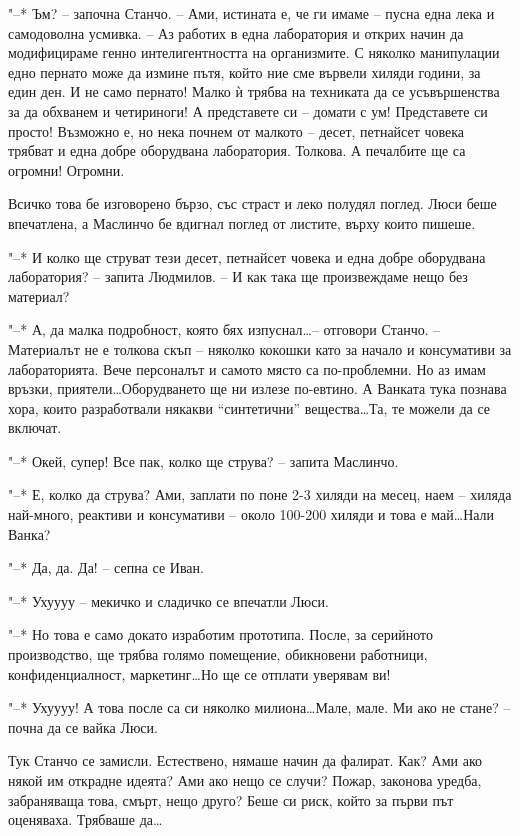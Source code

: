 \documentclass[ebook,openany,12pt]{memoir}
\begin{document}
"--* Ъм? – започна Станчо. – Ами, истината е, че ги имаме – пусна една лека и самодоволна усмивка. – Аз работих в една лаборатория и открих начин да модифицираме генно интелигентността на организмите. С няколко манипулации едно пернато може да измине пътя, който ние сме вървели хиляди години, за един ден. И не само пернато! Малко ѝ трябва на техниката да се усъвършенства за да обхванем и четириноги! А представете си – домати с ум! Представете си просто! Възможно е, но нека почнем от малкото – десет, петнайсет човека трябват и една добре оборудвана лаборатория. Толкова. А печалбите ще са огромни! Огромни.

Всичко това бе изговорено бързо, със страст и леко полудял поглед. Люси беше впечатлена, а Маслинчо бе вдигнал поглед от листите, върху които пишеше.

"--* И колко ще струват тези десет, петнайсет човека и една добре оборудвана лаборатория? – запита Людмилов. – И как така ще произвеждаме нещо без материал?

"--* А, да малка подробност, която бях изпуснал\ldots – отговори Станчо. – Материалът не е толкова скъп – няколко кокошки като за начало и консумативи за лабораторията. Вече персоналът и самото място са по-проблемни. Но аз имам връзки, приятели\ldots Оборудване\-то ще ни излезе по-евтино. А Ванката тука познава хора, които разработвали някакви ``синтетични'' вещества\ldots Та, те можели да се включат.

"--* Окей, супер! Все пак, колко ще струва? – запита Маслинчо.

"--* Е, колко да струва? Ами, заплати по поне 2-3 хиляди на месец, наем – хиляда най-много, реактиви и консумативи – около 100-200 хиляди и това е май\ldots Нали Ванка?

"--* Да, да. Да! – сепна се Иван.

"--* Ухуууу – мекичко и сладичко се впечатли Люси.

"--* Но това е само докато изработим прототипа. После, за серийното производство, ще трябва голямо помещение, обикновени работници, конфиденциалност, маркетинг\ldots Но ще се отплати уверявам ви!

"--* Ухуууу! А това после са си няколко милиона\ldots Ма\-ле, мале. Ми ако не стане? – почна да се вайка Люси.

Тук Станчо се замисли. Естествено, нямаше начин да фалират. Как? Ами ако някой им открадне идеята? Ами ако нещо се случи? Пожар, законова уредба, забраняваща това, смърт, нещо друго? Беше си риск, който за първи път оценяваха. Трябваше да\ldots
\end{document}
